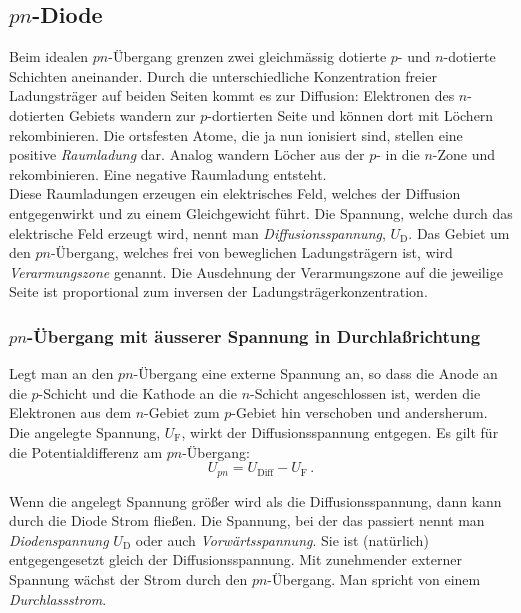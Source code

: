 \subsection{$pn$-Diode}

Beim idealen $pn$-\"Ubergang grenzen zwei gleichm\"assig dotierte $p$-
und $n$-dotierte Schichten aneinander. Durch die unterschiedliche
Konzentration freier Ladungstr\"ager auf beiden Seiten kommt es zur
Diffusion: Elektronen des $n$-dotierten Gebiets wandern zur
$p$-dortierten Seite und k\"onnen dort mit L\"ochern rekombinieren. Die 
ortsfesten Atome, die ja nun ionisiert sind, stellen eine
positive {\it Raumladung} dar. Analog wandern L\"ocher aus der
$p$- in die $n$-Zone und rekombinieren. Eine negative Raumladung
entsteht.\\
Diese Raumladungen erzeugen ein elektrisches Feld,
welches der Diffusion entgegenwirkt und zu einem Gleichgewicht
f\"uhrt. Die Spannung, welche durch das elektrische Feld erzeugt
wird, nennt man {\it Diffusionsspannung}, $U_{\mathrm{D}}$. Das Gebiet
um den $pn$-\"Ubergang, welches frei von beweglichen Ladungstr{\"a}gern
 ist, wird {\it Verarmungszone} genannt. 
Die Ausdehnung der Verarmungszone auf die
jeweilige Seite ist proportional zum inversen der
Ladungstr\"agerkonzentration.

\subsubsection{$pn$-\"Ubergang mit \"ausserer Spannung in Durchlaßrichtung}

Legt man an den $pn$-\"Ubergang eine externe Spannung an, so dass die
Anode an die $p$-Schicht und die Kathode an die $n$-Schicht
angeschlossen ist, werden die Elektronen aus dem $n$-Gebiet zum
$p$-Gebiet hin verschoben und andersherum. Die angelegte Spannung,
$U_{\mathrm{F}}$, wirkt der Diffusionsspannung entgegen. Es gilt f\"ur
die Potentialdifferenz am $pn$-\"Ubergang:
%
\begin{equation}
U_{pn} = U_{\mathrm{Diff}} - U_{\mathrm{F}} \, .
\end{equation}

\noindent
Wenn die angelegt Spannung größer wird als die Diffusionsspannung, dann kann durch die Diode Strom fließen. Die Spannung, bei der das passiert nennt man \textit{Diodenspannung} $U_{\mathrm{D}}$ oder auch \textit{Vorwärtsspannung}. Sie ist (natürlich) entgegengesetzt gleich der Diffusionsspannung.
Mit zunehmender externer Spannung w\"achst der Strom durch den $pn$-\"Ubergang. Man spricht von einem {\it Durchlassstrom}.

